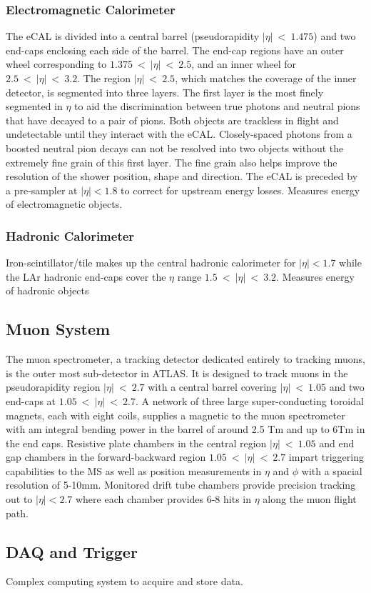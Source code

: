 \subsubsection{Electromagnetic Calorimeter}
The eCAL is divided into a central barrel (pseudorapidity $|\eta|~<~1.475$) and two end-caps enclosing each side of the barrel.  The end-cap regions have an outer wheel corresponding to $1.375~<~|\eta|~<~2.5$, and an inner wheel for $2.5~<~|\eta|~<~3.2$.  The region $|\eta|~<~2.5$, which matches the coverage of the inner detector, is segmented into three layers.  The first layer is the most finely segmented in $\eta$ to aid the discrimination between true photons and neutral pions that have decayed to a pair of pions.  Both objects are trackless in flight and undetectable until they interact with the eCAL.  Closely-spaced photons from a boosted neutral pion decays can not be resolved into two objects without the extremely fine grain of this first layer.  The fine grain also helps improve the resolution of the shower position, shape and direction.  The eCAL is preceded by a pre-sampler at $|\eta| < 1.8$ to correct for upstream energy losses.
Measures energy of electromagnetic objects.

\subsubsection{Hadronic Calorimeter}
Iron-scintillator/tile makes up the central hadronic calorimeter for $|\eta| < 1.7$ while the LAr hadronic end-caps cover the $\eta$ range $1.5~<~|\eta|~<~3.2$.  
Measures energy of hadronic objects

\subsection{Muon System}
The muon spectrometer, a tracking detector dedicated entirely to tracking muons, is the outer most sub-detector in ATLAS.  It is designed to track muons in the pseudorapidity region $|\eta|~<~2.7$ with a central barrel covering $|\eta|~<~1.05$ and two end-caps at $1.05~<~|\eta|~<~2.7$.  A network of three large super-conducting toroidal magnets, each with eight coils, supplies a magnetic to the muon spectrometer with am integral bending power in the barrel of around 2.5 Tm and up to 6Tm in the end caps.  Resistive plate chambers in the central region $|\eta|~<~1.05$ and end gap chambers in the forward-backward region $1.05~<~|\eta|~<~2.7$ impart triggering capabilities to the MS as well as position measurements in $\eta$ and $\phi$ with a spacial resolution of 5-10mm. Monitored drift tube chambers provide precision tracking out to $|\eta| < 2.7$ where each chamber provides 6-8 hits in $\eta$ along the muon flight path. 

\subsection{DAQ and Trigger}
Complex computing system to acquire and store data.

